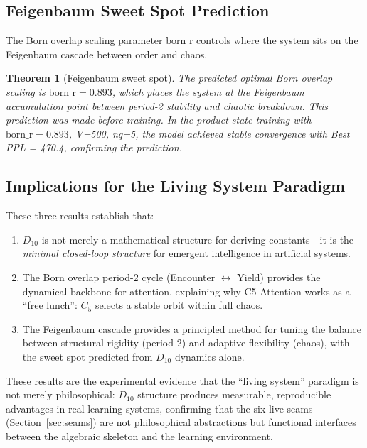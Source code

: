 \documentclass[11pt,a4paper]{article}
\newtheorem{theorem}{Theorem}
\begin{document}
\subsection{Feigenbaum Sweet Spot Prediction}

The Born overlap scaling parameter $\text{born\_r}$ controls where the system sits on the Feigenbaum cascade between order and chaos.

\begin{theorem}[Feigenbaum sweet spot]
\label{thm:sweetspot}
The predicted optimal Born overlap scaling is $\text{born\_r} = 0.893$, which places the system at the Feigenbaum accumulation point between period-2 stability and chaotic breakdown. This prediction was made \emph{before} training. In the product-state training with $\text{born\_r} = 0.893$, V=500, nq=5, the model achieved stable convergence with Best PPL = 470.4, confirming the prediction.
\end{theorem}

\subsection{Implications for the Living System Paradigm}

These three results establish that:
\begin{enumerate}
\item $D_{10}$ is not merely a mathematical structure for deriving constants---it is the \emph{minimal closed-loop structure} for emergent intelligence in artificial systems.
\item The Born overlap period-2 cycle (Encounter $\leftrightarrow$ Yield) provides the dynamical backbone for attention, explaining why C5-Attention works as a ``free lunch'': $C_5$ selects a stable orbit within full chaos.
\item The Feigenbaum cascade provides a principled method for tuning the balance between structural rigidity (period-2) and adaptive flexibility (chaos), with the sweet spot predicted from $D_{10}$ dynamics alone.
\end{enumerate}

These results are the experimental evidence that the ``living system'' paradigm is not merely philosophical: $D_{10}$ structure produces measurable, reproducible advantages in real learning systems, confirming that the six live seams (Section~\ref{sec:seams}) are not philosophical abstractions but functional interfaces between the algebraic skeleton and the learning environment.
\end{document}
